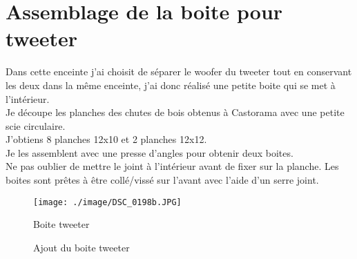 \documentclass[a4paper,english]{report}
\begin{document}
			\section{Assemblage de la boite pour tweeter}
			Dans cette enceinte j'ai choisit de séparer le woofer du tweeter tout en conservant les deux dans la même enceinte, j'ai donc réalisé une petite boite qui se met à l'intérieur.\\
			Je découpe les planches des chutes de bois obtenus à Castorama avec une petite scie circulaire.\\
			J'obtiens 8 planches 12x10 et 2 planches 12x12.\\
			Je les assemblent avec une presse d'angles pour obtenir deux boites.\\
			Ne pas oublier de mettre le joint à l'intérieur avant de fixer sur la planche. Les boites sont prêtes à être collé/vissé sur l'avant avec l'aide d'un serre joint.\\
				\begin{figure}[H]
					\centering
					
				\end{figure}		
			    \begin{figure}[h!]
					 	
					 	\begin{minipage}[c]{.45\linewidth}
					 		\begin{center}
					 			\texttt{[image: ./image/DSC\_0198b.JPG]}
					 			\label{Boite tweeter}
					 			\caption{Boite tweeter}
					 		\end{center}
					 	\end{minipage}
					 	\hfill
					 	\begin{minipage}[c]{.45\linewidth}
					 		\begin{center}
					 		\label{Ajout du boite tweeter}
					 		\caption{Ajout du boite tweeter}
					 		\end{center}
					 	\end{minipage}
					 \end{figure} 	
			
\end{document}

